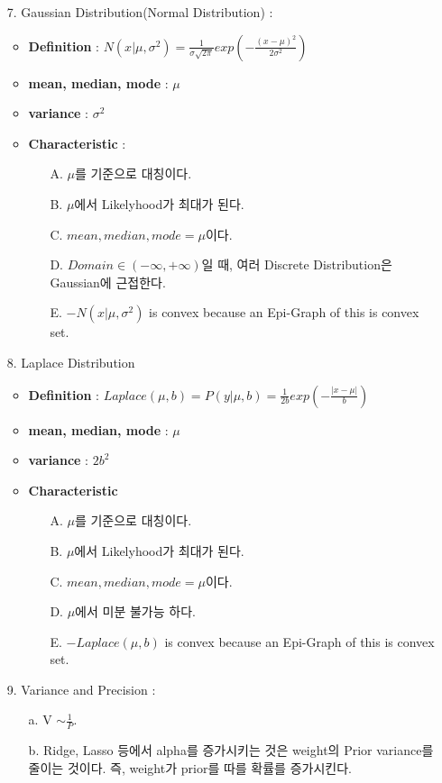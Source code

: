 \documentclass{article}
\begin{document}
\begin{itemize}
    \item[7.] Gaussian Distribution(Normal Distribution) : 
        \begin{itemize}
            \item \textbf{Definition} : $N(x|\mu, {\sigma}^2) = \frac{1}{\sigma\sqrt{2\pi}}exp(-\frac{(x-\mu)^2}{2{\sigma}^2})$
            \item \textbf{mean, median, mode} : $\mu$
            \item \textbf{variance} : ${\sigma}^2$
            \item \textbf{Characteristic} :
                \begin{itemize}
                    \item [A.] $\mu$를 기준으로 대칭이다.
                    \item [B.] $\mu$에서 Likelyhood가 최대가 된다.
                    \item [C.] $mean, median, mode = \mu$이다.
                    \item [D.] $Domain \in (-\infty, +\infty)$일 때, 여러 Discrete Distribution은 Gaussian에 근접한다.
                    \item [E.]  $-N(x|\mu, \sigma^2)$ is convex because an Epi-Graph of this is convex set.
                \end{itemize}
        \end{itemize}
    \item[8.] Laplace Distribution
        \begin{itemize}
            \item \textbf{Definition} : $Laplace(\mu,b) = P(y|\mu, b) = \frac{1}{2b}exp(-\frac{|x-\mu|}{b})$
            \item \textbf{mean, median, mode} : $\mu$
            \item \textbf{variance} : $2b^2$ 
            \item \textbf{Characteristic}
                \begin{itemize}
                    \item [A.] $\mu$를 기준으로 대칭이다.
                    \item [B.] $\mu$에서 Likelyhood가 최대가 된다.
                    \item [C.] $mean, median, mode = \mu$이다.
                    \item [D.] $\mu$에서 미분 불가능 하다.
                    \item [E.] $-Laplace(\mu, b)$ is convex because an Epi-Graph of this is convex set.
                \end{itemize}
        \end{itemize}
    \item[9.] Variance and Precision : 
       \begin{itemize}
           \item[a.] V $\sim \frac{1}{P}$.
           \item[b.] Ridge, Lasso 등에서 alpha를 증가시키는 것은 weight의 Prior variance를 줄이는 것이다. 즉, weight가 prior를 따를 확률를 증가시킨다.
       \end{itemize}
\end{itemize}
\end{document}
